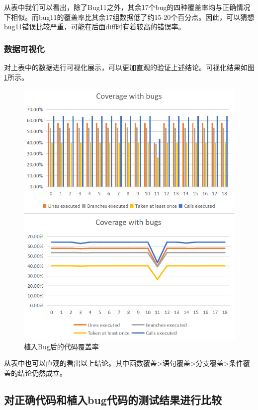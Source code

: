 \documentclass[12pt, a4paper, oneside,bibend=bibtex]{ctexart}
\begin{document}
从表中我们可以看出，除了Bug11之外，其余17个bug的四种覆盖率均与正确情况下相似。而bug11的覆盖率比其余17组数据低了约15-20个百分点。因此，可以猜想bug11错误比较严重，可能在后面diff时有着较高的错误率。

\subsubsection{数据可视化}
对上表中的数据进行可视化展示，可以更加直观的验证上述结论。可视化结果如图\ref{handle}所示。

\begin{figure}[htbp]
    \centering
    \includegraphics[width=14cm]{images/handle.png}
    \caption{植入Bug后的代码覆盖率}
    \label{handle}
\end{figure}

从表中也可以直观的看出以上结论。其中函数覆盖>语句覆盖>分支覆盖>条件覆盖的结论仍然成立。
\subsection{对正确代码和植入bug代码的测试结果进行比较}
\end{document}
